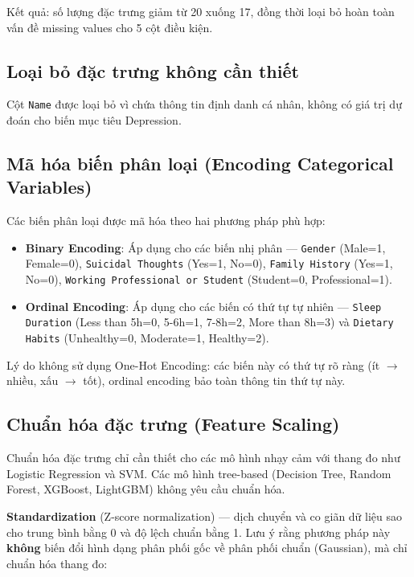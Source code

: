 Kết quả: số lượng đặc trưng giảm từ 20 xuống 17, đồng thời loại bỏ hoàn toàn vấn đề missing values cho 5 cột điều kiện.

\subsection{Loại bỏ đặc trưng không cần thiết}
\label{subsec:drop_features}

Cột \texttt{Name} được loại bỏ vì chứa thông tin định danh cá nhân, không có giá trị dự đoán cho biến mục tiêu Depression.

\subsection{Mã hóa biến phân loại (Encoding Categorical Variables)}
\label{subsec:encoding}

Các biến phân loại được mã hóa theo hai phương pháp phù hợp:

\begin{itemize}[noitemsep]
    \item \textbf{Binary Encoding}: Áp dụng cho các biến nhị phân --- \texttt{Gender} (Male=1, Female=0), \texttt{Suicidal Thoughts} (Yes=1, No=0), \texttt{Family History} (Yes=1, No=0), \texttt{Working Professional or Student} (Student=0, Professional=1).
    \item \textbf{Ordinal Encoding}: Áp dụng cho các biến có thứ tự tự nhiên --- \texttt{Sleep Duration} (Less than 5h=0, 5-6h=1, 7-8h=2, More than 8h=3) và \texttt{Dietary Habits} (Unhealthy=0, Moderate=1, Healthy=2).
\end{itemize}

Lý do không sử dụng One-Hot Encoding: các biến này có thứ tự rõ ràng (ít $\rightarrow$ nhiều, xấu $\rightarrow$ tốt), ordinal encoding bảo toàn thông tin thứ tự này.

\subsection{Chuẩn hóa đặc trưng (Feature Scaling)}
\label{subsec:scaling}

Chuẩn hóa đặc trưng chỉ cần thiết cho các mô hình nhạy cảm với thang đo như Logistic Regression và SVM. Các mô hình tree-based (Decision Tree, Random Forest, XGBoost, LightGBM) không yêu cầu chuẩn hóa.

\textbf{Standardization} (Z-score normalization) --- dịch chuyển và co giãn dữ liệu sao cho trung bình bằng 0 và độ lệch chuẩn bằng 1. Lưu ý rằng phương pháp này \textbf{không} biến đổi hình dạng phân phối gốc về phân phối chuẩn (Gaussian), mà chỉ chuẩn hóa thang đo:

